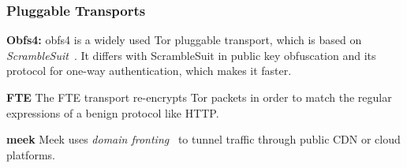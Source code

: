 \subsubsection{Pluggable Transports}
\begin{compactitem}
\item	\textbf{Obfs4:}
obfs4 is a widely used Tor pluggable transport, which is based on \textit{ScrambleSuit}~\cite{scramblesuit}. It differs with ScrambleSuit in public key obfuscation and its protocol for one-way authentication, which makes it faster. 
\item \textbf{FTE} 
The FTE transport re-encrypts Tor packets in order to match the regular expressions of a benign protocol like HTTP. 
\item\textbf{meek}
Meek uses \textit{domain fronting}~\cite{meek-PETS} to tunnel traffic through public CDN or cloud platforms. 
\end{compactitem}
